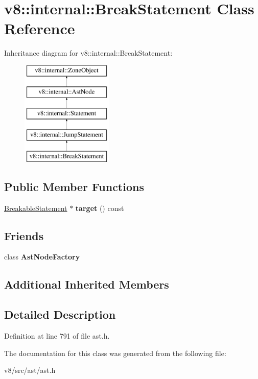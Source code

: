 \hypertarget{classv8_1_1internal_1_1BreakStatement}{}\section{v8\+:\+:internal\+:\+:Break\+Statement Class Reference}
\label{classv8_1_1internal_1_1BreakStatement}
Inheritance diagram for v8\+:\+:internal\+:\+:Break\+Statement\+:\begin{figure}[H]
\begin{center}
\leavevmode
\includegraphics[height=5.000000cm]{classv8_1_1internal_1_1BreakStatement}
\end{center}
\end{figure}
\subsection*{Public Member Functions}
\begin{DoxyCompactItemize}
\item 
\mbox{\label{classv8_1_1internal_1_1BreakStatement_ac14e533b096ff3f2286f59a728c5e440}} 
\mbox{\hyperlink{classv8_1_1internal_1_1BreakableStatement}{Breakable\+Statement}} $\ast$ {\bfseries target} () const
\end{DoxyCompactItemize}
\subsection*{Friends}
\begin{DoxyCompactItemize}
\item 
\mbox{\label{classv8_1_1internal_1_1BreakStatement_a8d587c8ad3515ff6433eb83c578e795f}} 
class {\bfseries Ast\+Node\+Factory}
\end{DoxyCompactItemize}
\subsection*{Additional Inherited Members}


\subsection{Detailed Description}


Definition at line 791 of file ast.\+h.



The documentation for this class was generated from the following file\+:\begin{DoxyCompactItemize}
\item 
v8/src/ast/ast.\+h\end{DoxyCompactItemize}
